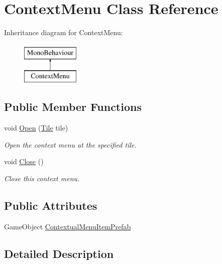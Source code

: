 \hypertarget{class_context_menu}{}\section{Context\+Menu Class Reference}
\label{class_context_menu}
Inheritance diagram for Context\+Menu\+:\begin{figure}[H]
\begin{center}
\leavevmode
\includegraphics[height=2.000000cm]{class_context_menu}
\end{center}
\end{figure}
\subsection*{Public Member Functions}
\begin{DoxyCompactItemize}
\item 
void \hyperlink{class_context_menu_a09a23a7066bb880128dff3eaa7731787}{Open} (\hyperlink{class_tile}{Tile} tile)
\begin{DoxyCompactList}\small\item\em Open the context menu at the specified tile. \end{DoxyCompactList}\item 
void \hyperlink{class_context_menu_af006f7eed65862d739697b80f267119b}{Close} ()
\begin{DoxyCompactList}\small\item\em Close this context menu. \end{DoxyCompactList}\end{DoxyCompactItemize}
\subsection*{Public Attributes}
\begin{DoxyCompactItemize}
\item 
Game\+Object \hyperlink{class_context_menu_a1e8ca33e07938af81b9bf4f8525b6620}{Contextual\+Menu\+Item\+Prefab}
\end{DoxyCompactItemize}


\subsection{Detailed Description}


